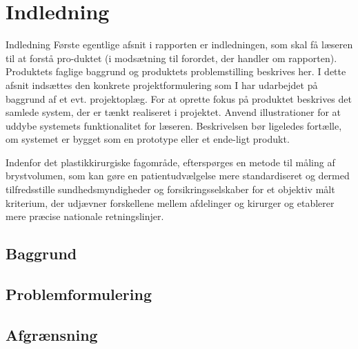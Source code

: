 \chapter{Indledning}

Indledning
Første egentlige afsnit i rapporten er indledningen, som skal få læseren til at forstå pro-duktet (i modsætning til forordet, der handler om rapporten). Produktets faglige baggrund og produktets problemstilling beskrives her.
I dette afsnit indsættes den konkrete projektformulering som I har udarbejdet på baggrund af et evt. projektoplæg.
For at oprette fokus på produktet beskrives det samlede system, der er tænkt realiseret i projektet. Anvend illustrationer for at uddybe systemets funktionalitet for læseren.
Beskrivelsen bør ligeledes fortælle, om systemet er bygget som en prototype eller et ende-ligt produkt.

 

Indenfor det plastikkirurgiske fagområde, efterspørges en metode til måling af brystvolumen, som kan gøre en patientudvælgelse mere standardiseret og dermed tilfredsstille sundhedsmyndigheder og forsikringsselskaber for et objektiv målt kriterium, der udjævner forskellene mellem afdelinger og kirurger og etablerer mere præcise nationale retningslinjer. 




\section{Baggrund}

\section{Problemformulering}

\section{Afgrænsning}
